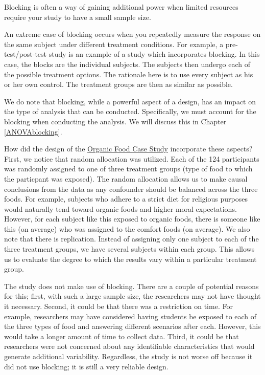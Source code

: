 \documentclass[]{book}
\theoremstyle{plain}
\theoremstyle{mydefn}
\theoremstyle{myexmpl}
\theoremstyle{remark}
\let\BeginKnitrBlock\begin \let\EndKnitrBlock\end
\let\BeginKnitrBlock\begin \let\EndKnitrBlock\end
\begin{document}
\BeginKnitrBlock{rmdtip}
Blocking is often a way of gaining additional power when limited
resources require your study to have a small sample size.
\EndKnitrBlock{rmdtip}

An extreme case of blocking occurs when you repeatedly measure the
response on the same subject under different treatment conditions. For
example, a pre-test/post-test study is an example of a study which
incorporates blocking. In this case, the blocks are the individual
subjects. The subjects then undergo each of the possible treatment
options. The rationale here is to use every subject as his or her own
control. The treatment groups are then as similar as possible.

We do note that blocking, while a powerful aspect of a design, has an
impact on the type of analysis that can be conducted. Specifically, we
must account for the blocking when conducting the analysis. We will
discuss this in Chapter \ref{ANOVAblocking}.

How did the design of the \protect\hyperlink{CaseOrganic}{Organic Food
Case Study} incorporate these aspects? First, we notice that random
allocation was utilized. Each of the 124 participants was randomly
assigned to one of three treatment groups (type of food to which the
particpant was exposed). The random allocation allows us to make causal
conclusions from the data as any confounder should be balanced across
the three foods. For example, subjects who adhere to a strict diet for
religious purposes would naturally tend toward organic foods and higher
moral expectations. However, for each subject like this exposed to
organic foods, there is someone like this (on average) who was assigned
to the comfort foods (on average). We also note that there is
replication. Instead of assigning only one subject to each of the three
treatment groups, we have several subjects within each group. This
allows us to evaluate the degree to which the results vary within a
particular treatment group.

The study does not make use of blocking. There are a couple of potential
reasons for this; first, with such a large sample size, the researchers
may not have thought it necessary. Second, it could be that there was a
restriction on time. For example, researchers may have considered having
students be exposed to each of the three types of food and answering
different scenarios after each. However, this would take a longer amount
of time to collect data. Third, it could be that researchers were not
concerned about any identifiable characteristics that would generate
additional variability. Regardless, the study is not worse off because
it did not use blocking; it is still a very reliable design.
\end{document}
